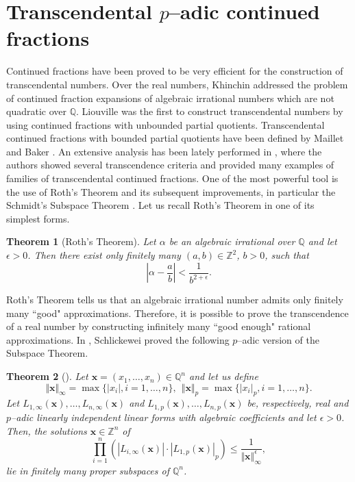 \documentclass[12pt, reqno]{amsart}
\theoremstyle{plain}
\newtheorem{Theorem}{Theorem}
\theoremstyle{definition}
\begin{document}
\section{Transcendental $p$--adic continued fractions}\label{Sec: transce}
Continued fractions have been proved to be very efficient for the construction of transcendental numbers. Over the real numbers, Khinchin \cite{KHI} addressed the problem of continued fraction expansions of algebraic irrational numbers which are not quadratic over $\mathbb{Q}$. Liouville \cite{LIO} was the first to construct transcendental numbers by using continued fractions with unbounded partial quotients. Transcendental continued fractions with bounded partial quotients have been defined by Maillet \cite{MAI} and Baker \cite{BAK}. An extensive analysis has been lately performed in \cite{AB, AB2, AB3, ABD}, where the authors showed several transcendence criteria and provided many examples of families of transcendental continued fractions. One of the most powerful tool is the use of Roth's Theorem \cite{ROTH} and its subsequent improvements, in particular the  Schmidt's Subspace Theorem \cite{SCHM}. Let us recall Roth's Theorem in one of its simplest forms.
\begin{Theorem}[Roth's Theorem]
Let $\alpha$ be an algebraic irrational over $\mathbb{Q}$ and let $\epsilon >0$. Then there exist only finitely many $(a,b)\in\mathbb{Z}^2$, $b>0$, such that
\[\left|\alpha-\frac{a}{b}\right|<\frac{1}{b^{2+\epsilon}}.\]  
\end{Theorem}
Roth's Theorem tells us that an algebraic irrational number admits only finitely many ``good" approximations. Therefore, it is possible to prove the transcendence of a real number by constructing infinitely many ``good enough" rational approximations. In \cite{SCHL}, Schlickewei proved the following $p$--adic version of the Subspace Theorem.
\begin{Theorem}[\cite{SCHL}]\label{Thm: Schlik}
Let $\mathbf{x}=(x_1,\ldots,x_n)\in\mathbb{Q}^n$ and let us define
\[\Vert \mathbf{x} \Vert_{\infty}=\max \{|x_i|,i=1,\ldots,n\}, \ \ \Vert \mathbf{x} \Vert_{p}=\max \{|x_i|_p,i=1,\ldots,n\}.\]
Let $L_{1,\infty}(\mathbf{x}),\ldots,L_{n,\infty}(\mathbf{x})$ and $L_{1,p}(\mathbf{x}),\ldots,L_{n,p}(\mathbf{x})$ be, respectively, real and $p$--adic linearly independent linear forms with algebraic coefficients and let $\epsilon>0$. Then, the solutions $\mathbf{x}\in\mathbb{Z}^n$ of
\[\prod\limits_{i=1}^n(|L_{i,\infty}(\mathbf{x})|\cdot |L_{1,p}(\mathbf{x})|_p)\leq \frac{1}{\Vert \mathbf{x} \Vert_{\infty}^{\epsilon}},\]
lie in finitely many proper subspaces of $\mathbb{Q}^n$.
\end{Theorem}
\end{document}
